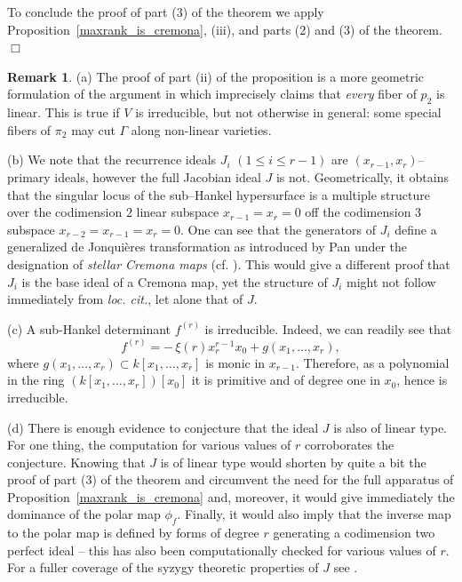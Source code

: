 \documentclass[11pt]{article}   %
\theoremstyle{definition}
\newtheorem{Remark}[Theorem]{Remark}
\numberwithin{Theorem}{section} \numberwithin{equation}{section}
\def\QED{\hfill$\Box$}
\def\qed{\QED}
\begin{document}
{{\medskip

To conclude the proof of part (3) of the theorem we apply
Proposition~\ref{maxrank_is_cremona}, (iii), and parts (2) and (3)
of the theorem.   \qed


\begin{Remark}\label{jonquieres}\rm (a)
{The proof of part (ii) of the proposition is a more geometric
formulation of the argument in \cite[Theorem 4.1]{Simis2} which
imprecisely claims that {\em every} fiber of $p_2$ is linear. This
is true if $V$ is irreducible, but not otherwise in general: some
special fibers of $\pi_2$ may cut $\Gamma$ along non-linear
varieties.}


(b) We note that the recurrence ideals $J_i$
$(1\leq i\leq r-1)$ are $(x_{r-1},x_r)$--primary ideals, however the
full Jacobian ideal $J$ is not. Geometrically, it obtains that the
singular locus of the sub--Hankel hypersurface is a multiple
structure over the codimension $2$ linear subspace $x_{r-1}=x_r=0$
off the codimension $3$ subspace $x_{r-2}=x_{r-1}=x_r=0$. One can
see that the generators of $J_i$ define a generalized de
Jonqui\`eres transformation as introduced by Pan under the
designation of {\it stellar Cremona maps\/} (cf. \cite{Pan0}). This
would give a different proof that $J_i$ is the base ideal of a
Cremona map, yet the structure of $J_i$ might not follow immediately
from {\it loc. cit.}, let alone that of $J$.

(c) A sub-Hankel determinant $f^{(r)}$ is irreducible. Indeed, we
can readily see that
$$f^{(r)}=-\,\xi(r)x_r^{r-1}x_0+
g(x_1,\ldots,x_r),$$
where $g(x_1,\ldots,x_r)\subset
k[x_1,\ldots,x_r]$ is monic in $x_{r-1}$. Therefore, as a polynomial
in the ring $(k[x_1,\ldots,x_r])[x_0]$ it is primitive and of degree
one in $x_0$, hence is irreducible.

(d) There is enough evidence to conjecture that the ideal $J$ is
also of linear type. For one thing, the computation for various
values of $r$ corroborates the conjecture. Knowing that $J$ is of
linear type would shorten by quite a bit the proof of part (3) of
the theorem and circumvent the need for the full apparatus of
Proposition~\ref{maxrank_is_cremona} and, moreover, it would give
immediately the dominance of the polar map $\phi_f$. Finally, it
would also imply that the inverse map to the polar map is defined by
forms of degree $r$ generating a codimension two perfect ideal --
this has also been computationally checked for various values of
$r$. For a fuller coverage of the syzygy theoretic properties of $J$
see \cite{cremona2}.
\end{Remark}



}}
\end{document}
